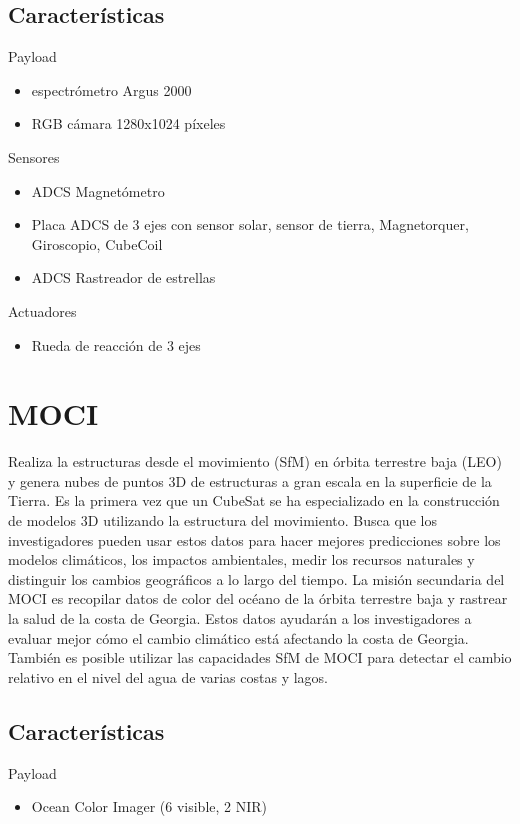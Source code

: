 \documentclass[12pt]{extarticle}
\begin{document}
 \subsection{Características}
 Payload
 \begin{itemize}
     \item espectrómetro Argus 2000
     \item RGB cámara 1280x1024 píxeles 
 \end{itemize}
 Sensores
 \begin{itemize}
     \item ADCS Magnetómetro
     \item Placa ADCS de 3 ejes con sensor solar, sensor de tierra,
Magnetorquer, Giroscopio, CubeCoil
\item ADCS Rastreador de estrellas
 \end{itemize}
 Actuadores
 \begin{itemize}
     \item Rueda de reacción de 3 ejes
 \end{itemize}
 
 \section{MOCI}
 Realiza la estructuras desde el movimiento (SfM) en  órbita terrestre baja (LEO) y genera nubes de puntos 3D de estructuras a gran escala en la superficie de la Tierra. Es la primera vez que un CubeSat se ha especializado en la construcción de modelos 3D utilizando la estructura del movimiento. Busca que los investigadores pueden usar estos datos para hacer mejores predicciones sobre los modelos climáticos, los impactos ambientales, medir los recursos naturales y distinguir los cambios geográficos a lo largo del tiempo. La misión secundaria del MOCI es recopilar datos de color del océano de la órbita terrestre baja y rastrear la salud de la costa de Georgia. Estos datos ayudarán a los investigadores a evaluar mejor cómo el cambio climático está afectando la costa de Georgia. También es posible utilizar las capacidades SfM de MOCI para detectar el cambio relativo en el nivel del agua de varias costas y lagos.
 \subsection{Características}
 Payload
 \begin{itemize}
     \item Ocean Color Imager (6 visible, 2 NIR)
 \end{itemize}
\end{document}
